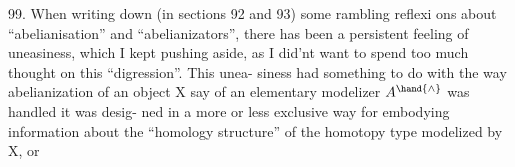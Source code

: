 99. When writing down (in sections 92 and 93) some rambling reflexi%
ons about ``abelianisation'' and ``abelianizators'', there has been a
persistent feeling of uneasiness, which I kept pushing aside, as I
did'nt want to spend too much thought on this ``digression''. This unea-%
siness  had  something to do with the way abelianization \hand{(}of an
object X say of an elementary modelizer $A^{\hand{\wedge}}$\hand{)} was handled\hand{,}  it was desig-%
ned in a more or less exclusive way for embodying information about
the ``homology structure'' of the homotopy type modelized by X, or


